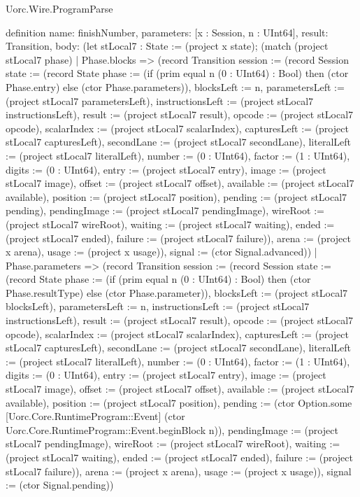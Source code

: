 \begin{lexlean}{Uorc.Wire.ProgramParse}
\begin{semanticmodule}
definition{
  name: finishNumber,
  parameters: [x : Session, n : UInt64],
  result: Transition,
  body: (let stLocal7 : State := (project x state); (match (project stLocal7 phase)
    | Phase.blocks => (record Transition {session := (record Session {state := (record State {phase := (if (prim equal n (0 : UInt64) : Bool) then (ctor Phase.entry) else (ctor Phase.parameters)), blocksLeft := n, parametersLeft := (project stLocal7 parametersLeft), instructionsLeft := (project stLocal7 instructionsLeft), result := (project stLocal7 result), opcode := (project stLocal7 opcode), scalarIndex := (project stLocal7 scalarIndex), capturesLeft := (project stLocal7 capturesLeft), secondLane := (project stLocal7 secondLane), literalLeft := (project stLocal7 literalLeft), number := (0 : UInt64), factor := (1 : UInt64), digits := (0 : UInt64), entry := (project stLocal7 entry), image := (project stLocal7 image), offset := (project stLocal7 offset), available := (project stLocal7 available), position := (project stLocal7 position), pending := (project stLocal7 pending), pendingImage := (project stLocal7 pendingImage), wireRoot := (project stLocal7 wireRoot), waiting := (project stLocal7 waiting), ended := (project stLocal7 ended), failure := (project stLocal7 failure)}), arena := (project x arena), usage := (project x usage)}), signal := (ctor Signal.advanced)})
    | Phase.parameters => (record Transition {session := (record Session {state := (record State {phase := (if (prim equal n (0 : UInt64) : Bool) then (ctor Phase.resultType) else (ctor Phase.parameter)), blocksLeft := (project stLocal7 blocksLeft), parametersLeft := n, instructionsLeft := (project stLocal7 instructionsLeft), result := (project stLocal7 result), opcode := (project stLocal7 opcode), scalarIndex := (project stLocal7 scalarIndex), capturesLeft := (project stLocal7 capturesLeft), secondLane := (project stLocal7 secondLane), literalLeft := (project stLocal7 literalLeft), number := (0 : UInt64), factor := (1 : UInt64), digits := (0 : UInt64), entry := (project stLocal7 entry), image := (project stLocal7 image), offset := (project stLocal7 offset), available := (project stLocal7 available), position := (project stLocal7 position), pending := (ctor Option.some [Uorc.Core.RuntimeProgram::Event] (ctor Uorc.Core.RuntimeProgram::Event.beginBlock n)), pendingImage := (project stLocal7 pendingImage), wireRoot := (project stLocal7 wireRoot), waiting := (project stLocal7 waiting), ended := (project stLocal7 ended), failure := (project stLocal7 failure)}), arena := (project x arena), usage := (project x usage)}), signal := (ctor Signal.pending)})
}
\end{semanticmodule}
\end{lexlean}
